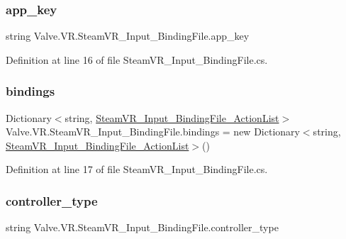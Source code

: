 \subsubsection{\texorpdfstring{app\_key}{app\_key}}
{\footnotesize\ttfamily string Valve.\+V\+R.\+Steam\+V\+R\+\_\+\+Input\+\_\+\+Binding\+File.\+app\+\_\+key}



Definition at line 16 of file Steam\+V\+R\+\_\+\+Input\+\_\+\+Binding\+File.\+cs.

\mbox{\label{class_valve_1_1_v_r_1_1_steam_v_r___input___binding_file_a270b416b897044452ca6946f4bf01938}} 
\subsubsection{\texorpdfstring{bindings}{bindings}}
{\footnotesize\ttfamily Dictionary$<$string, \mbox{\hyperlink{class_valve_1_1_v_r_1_1_steam_v_r___input___binding_file___action_list}{Steam\+V\+R\+\_\+\+Input\+\_\+\+Binding\+File\+\_\+\+Action\+List}}$>$ Valve.\+V\+R.\+Steam\+V\+R\+\_\+\+Input\+\_\+\+Binding\+File.\+bindings = new Dictionary$<$string, \mbox{\hyperlink{class_valve_1_1_v_r_1_1_steam_v_r___input___binding_file___action_list}{Steam\+V\+R\+\_\+\+Input\+\_\+\+Binding\+File\+\_\+\+Action\+List}}$>$()}



Definition at line 17 of file Steam\+V\+R\+\_\+\+Input\+\_\+\+Binding\+File.\+cs.

\mbox{\label{class_valve_1_1_v_r_1_1_steam_v_r___input___binding_file_a2bb8f41af919a73a470eedbcf9f847be}} 
\subsubsection{\texorpdfstring{controller\_type}{controller\_type}}
{\footnotesize\ttfamily string Valve.\+V\+R.\+Steam\+V\+R\+\_\+\+Input\+\_\+\+Binding\+File.\+controller\+\_\+type}



